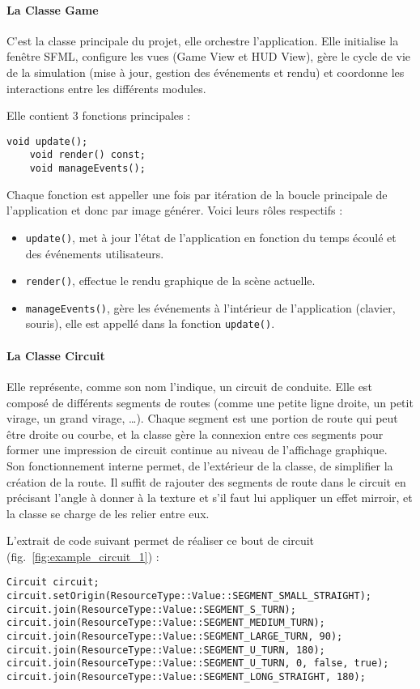 \paragraph[Game]{La Classe \textbf{Game}}
C'est la classe principale du projet, elle orchestre l'application.
Elle initialise la fenêtre SFML, configure les vues (Game View et HUD View), gère le cycle de vie de la simulation (mise à jour, gestion des événements et rendu) et coordonne les interactions entre les différents modules.

Elle contient 3 fonctions principales :
\begin{lstlisting}[style=CStyle, label={lst:game_class}]
    void update();
    void render() const;
    void manageEvents();
\end{lstlisting}
Chaque fonction est appeller une fois par itération de la boucle principale de l'application et donc par image générer.
Voici leurs rôles respectifs :
\begin{itemize}
    \item \texttt{update()}, met à jour l'état de l'application en fonction du temps écoulé et des événements utilisateurs.
    \item \texttt{render()}, effectue le rendu graphique de la scène actuelle.
    \item \texttt{manageEvents()}, gère les événements à l'intérieur de l'application (clavier, souris), elle est appellé dans la fonction \texttt{update()}.
\end{itemize}

\paragraph[Circuit]{La Classe \textbf{Circuit}}
Elle représente, comme son nom l'indique, un circuit de conduite.
Elle est composé de différents segments de routes (comme une petite ligne droite, un petit virage, un grand virage, \dots).
Chaque segment est une portion de route qui peut être droite ou courbe, et la classe gère la connexion entre ces segments pour former une impression de circuit continue au niveau de l'affichage graphique. \\
Son fonctionnement interne permet, de l'extérieur de la classe, de simplifier la création de la route.
Il suffit de rajouter des segments de route dans le circuit en précisant l'angle à donner à la texture et s'il faut lui appliquer un effet mirroir, et la classe se charge de les relier entre eux.

L'extrait de code suivant permet de réaliser ce bout de circuit (fig.~\ref{fig:example_circuit_1}) :
\begin{lstlisting}[style=CStyle, label={lst:code_circuit}]
Circuit circuit;
circuit.setOrigin(ResourceType::Value::SEGMENT_SMALL_STRAIGHT);
circuit.join(ResourceType::Value::SEGMENT_S_TURN);
circuit.join(ResourceType::Value::SEGMENT_MEDIUM_TURN);
circuit.join(ResourceType::Value::SEGMENT_LARGE_TURN, 90);
circuit.join(ResourceType::Value::SEGMENT_U_TURN, 180);
circuit.join(ResourceType::Value::SEGMENT_U_TURN, 0, false, true);
circuit.join(ResourceType::Value::SEGMENT_LONG_STRAIGHT, 180);
\end{lstlisting}

